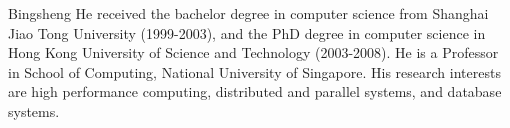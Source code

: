 \documentclass[journal]{IEEEtran}
\begin{document}
\begin{IEEEbiography}{Bingsheng He}
received the bachelor degree in computer science from Shanghai Jiao Tong University (1999-2003), and the PhD degree in computer science in Hong Kong University of Science and Technology (2003-2008). He is a Professor in School of Computing, National University of Singapore. His research interests are high performance computing, distributed and parallel systems, and database systems.
\end{IEEEbiography}

\vfill
\end{document}
